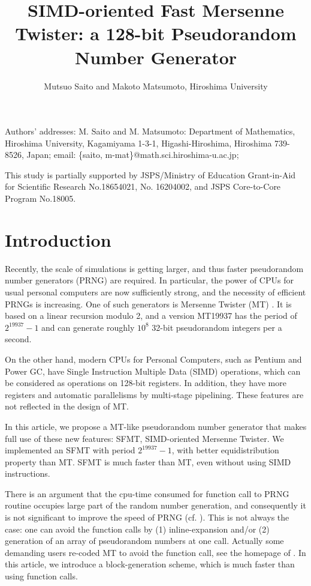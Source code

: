 \documentclass[acmnow]{acmtrans2m}
\title{SIMD-oriented Fast Mersenne Twister:
a 128-bit Pseudorandom Number Generator
}
\author{Mutsuo Saito and Makoto Matsumoto, Hiroshima University \\
}
\begin{document}
\maketitle

\begin{bottomstuff}
Authors' addresses: 
M. Saito and M. Matsumoto: Department of Mathematics, Hiroshima University,
Kagamiyama 1-3-1, Higashi-Hiroshima, Hiroshima 739-8526, Japan;
email: \{saito, m-mat\}@math.sci.hiroshima-u.ac.jp;

This study is partially supported by JSPS/Ministry of Education
Grant-in-Aid for Scientific Research No.18654021, No. 16204002,
and JSPS Core-to-Core Program No.18005.
\end{bottomstuff}

\section{Introduction}
Recently, the scale of simulations is getting larger,
and thus faster pseudorandom number generators (PRNG)
are required. In particular, the power of CPUs for
usual personal computers are now sufficiently strong,
and the necessity of efficient PRNGs is increasing.
One of such generators is Mersenne Twister (MT) \cite{MT}.
It is based on a linear recursion modulo 2, 
and a version MT19937 has the period of $2^{19937}-1$ and can generate
roughly $10^8$ 32-bit pseudorandom integers per a second.

On the other hand, modern CPUs for Personal Computers,
such as Pentium and Power GC, have 
Single Instruction Multiple Data (SIMD) operations,
which can be considered as operations 
on 128-bit registers. In addition, they have more registers
and automatic parallelisms by multi-stage pipelining. These features
are not reflected in the design of MT. 

In this article, we propose a MT-like 
pseudorandom number generator
that makes full use of these new features: SFMT, 
SIMD-oriented Mersenne Twister. 
We implemented an SFMT with period $2^{19937}-1$,
with better equidistribution property than MT. 
SFMT is much faster than MT, even without using SIMD instructions. 

There is an argument that the cpu-time consumed for 
function call to PRNG routine occupies large part of
the random number generation, and consequently 
it is not significant to improve the speed of PRNG 
(cf. \cite{XORSHIFT}).
This is not always the case: 
one can avoid the function calls by (1) inline-expansion
and/or (2) generation of an array of pseudorandom numbers
at one call. Actually some demanding users re-coded MT to avoid the 
function call, see the homepage of \cite{MT}. 
In this article, we introduce a block-generation scheme, which 
is much faster than using function calls.
\end{document}
